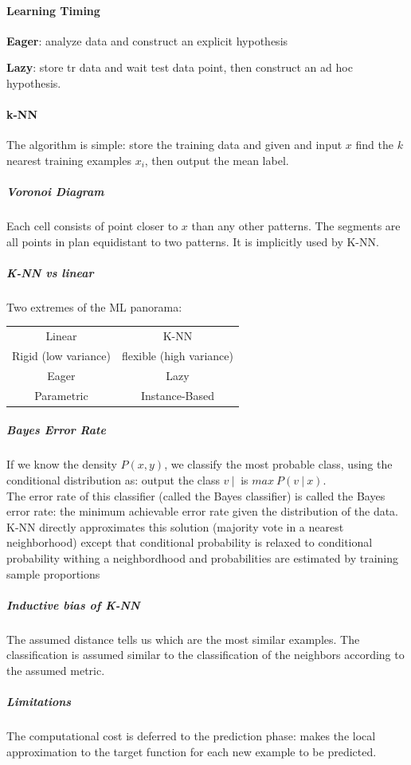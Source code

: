 \documentclass[10pt]{report}
\begin{document}
\paragraph{Learning Timing} \begin{list}{}{}
	\item \textbf{Eager}: analyze data and construct an explicit hypothesis
	\item \textbf{Lazy}: store tr data and wait test data point, then construct an ad hoc hypothesis.
\end{list}
\paragraph{k-NN}
The algorithm is simple: store the training data and given and input $x$ find the $k$ nearest training examples $x_i$, then output the mean label.
\subparagraph{Voronoi Diagram} Each cell consists of point closer to $x$ than any other patterns. The segments are all points in plan equidistant to two patterns. It is implicitly used by K-NN.
\subparagraph{K-NN vs linear} Two extremes of the ML panorama:
\begin{center}
	\begin{tabular}{c c}
		Linear & K-NN\\
		Rigid (low variance) & flexible (high variance)\\
		Eager & Lazy\\
		Parametric & Instance-Based
	\end{tabular}
\end{center}
\subparagraph{Bayes Error Rate} If we know the density $P(x,y)$, we classify the most probable class, using the conditional distribution as: output the class $v\:|\:$ is $max\:P(v\:|\:x)$.\\
The error rate of this classifier (called the Bayes classifier) is called the Bayes error rate: the minimum achievable error rate given the distribution of the data. K-NN directly approximates this solution (majority vote in a nearest neighborhood) except that conditional probability is relaxed to conditional probability withing a neighbordhood and probabilities are estimated by training sample proportions
\subparagraph{Inductive bias of K-NN} The assumed distance tells us which are the most similar examples. The classification is assumed similar to the classification of the neighbors according to the assumed metric.
\subparagraph{Limitations} The computational cost is deferred to the prediction phase: makes the local approximation to the target function for each new example to be predicted.\\
\end{document}
